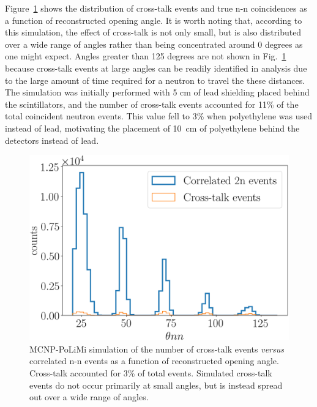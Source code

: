 Figure~\ref{fig:CrosstalkVScoincidence} shows the distribution of cross-talk events and true n-n coincidences as a function of reconstructed opening angle.
It is worth noting that, according to this simulation, the effect of cross-talk is not only small, but is also distributed over a wide range of angles rather than being concentrated around 0 degrees as one might expect.
Angles greater than 125 degrees are not shown in Fig.~\ref{fig:CrosstalkVScoincidence} because cross-talk events at large angles can be readily identified in analysis due to the large amount of time required for a neutron to travel the these distances.
The simulation was initially performed with 5 cm of lead shielding placed behind the scintillators, and the number of cross-talk events accounted for 11\% of the total coincident neutron events.
This value fell to 3\% when polyethylene was used instead of lead, motivating the placement of 10~cm of polyethylene behind the detectors instead of lead.
\begin{figure}
    \centering
    \includegraphics[width = \figsize\textwidth]{CrosstalkVScoincidence.png}
    \caption{
    MCNP-PoLiMi simulation of the number of cross-talk events \emph{versus} correlated n-n events as a function of reconstructed opening angle.
    Cross-talk accounted for 3\% of total events.
    Simulated cross-talk events do not occur primarily at small angles, but is instead spread out over a wide range of angles.
    }
    \label{fig:CrosstalkVScoincidence}
\end{figure}

